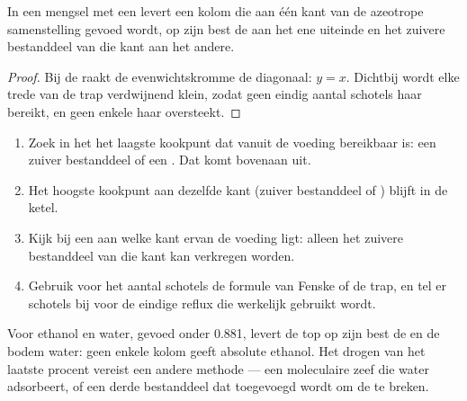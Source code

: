 \begin{proposition}\label{prop:b2:liquid-vapour-diagrams:azeotrope-limit}
In een mengsel met een  levert een kolom die aan één kant van de azeotrope
samenstelling gevoed wordt, op zijn best de  aan het ene uiteinde en het zuivere bestanddeel
van die kant aan het andere.
\end{proposition}

\begin{proof}
Bij de  raakt de evenwichtskromme de diagonaal: $y = x$. Dichtbij
wordt elke trede van de trap verdwijnend klein, zodat geen eindig aantal
schotels haar bereikt, en geen enkele haar oversteekt.
\end{proof}

\begin{method}\label{met:b2:liquid-vapour-diagrams:predict-distillation}
\begin{enumerate}
  \item Zoek in het  het laagste kookpunt dat vanuit de voeding bereikbaar is:
        een zuiver bestanddeel of een . Dat komt
        bovenaan uit.
  \item Het hoogste kookpunt aan dezelfde kant (zuiver bestanddeel of
        ) blijft in de ketel.
  \item Kijk bij een  aan welke kant ervan de voeding ligt: alleen het zuivere
        bestanddeel van die kant kan verkregen worden.
  \item Gebruik voor het aantal schotels de formule van Fenske of de trap,
        en tel er schotels bij voor de eindige reflux die werkelijk gebruikt wordt.
\end{enumerate}
\end{method}

Voor ethanol en water, gevoed onder 0.881, levert de top op zijn best de
 en de bodem water: geen enkele kolom geeft absolute ethanol. Het drogen van
het laatste procent vereist een andere methode --- een moleculaire zeef die water adsorbeert, of
een derde bestanddeel dat toegevoegd wordt om de  te breken.

